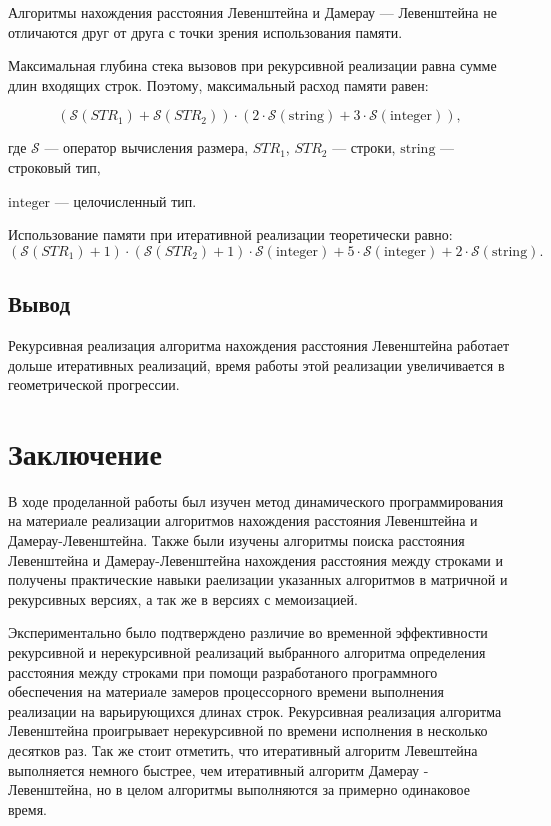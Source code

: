 \documentclass[12pt]{report}
\begin{document}
Алгоритмы нахождения расстояния Левенштейна и Дамерау — Левенштейна не отличаются друг от друга с точки зрения использования памяти.

Максимальная глубина стека вызовов при рекурсивной реализации равна сумме длин входящих строк. Поэтому, максимальный расход памяти равен: 

\begin{equation}
(\mathcal{S}(STR_1) + \mathcal{S}(STR_2)) \cdot (2 \cdot \mathcal{S}\mathrm{(string)} + 3 \cdot \mathcal{S}\mathrm{(integer)}),
\end{equation}

\noindent где $\mathcal{S}$ — оператор вычисления размера, $STR_1$, $STR_2$ — строки, $\mathrm{string}$ — строковый тип, 

\noindent $\mathrm{integer}$ — целочисленный тип.

Использование памяти при итеративной реализации теоретически равно:
\begin{equation}
(\mathcal{S}(STR_1) + 1) \cdot (\mathcal{S}(STR_2) + 1) \cdot \mathcal{S}\mathrm{(integer)} + 5\cdot \mathcal{S}\mathrm{(integer)} + 2 \cdot \mathcal{S}\mathrm{(string)}.
\end{equation}


\section{Вывод}

Рекурсивная реализация алгоритма нахождения расстояния Левенштейна работает дольше итеративных реализаций, время работы этой реализации увеличивается в геометрической прогрессии. 


\chapter*{Заключение}

В ходе проделанной работы был изучен метод динамического программирования на материале реализации алгоритмов нахождения расстояния Левенштейна и Дамерау-Левенштейна. Также были изучены алгоритмы поиска расстояния Левенштейна и Дамерау-Левенштейна нахождения расстояния между строками и получены практические навыки раелизации указанных алгоритмов в матричной и рекурсивных версиях, а так же в версиях с мемоизацией.

Экспериментально было подтверждено различие во временной эффективности рекурсивной и нерекурсивной реализаций выбранного алгоритма определения расстояния между строками при помощи разработаного программного обеспечения на материале замеров процессорного времени выполнения реализации на варьирующихся длинах строк. Рекурсивная реализация алгоритма Левенштейна проигрывает нерекурсивной по времени исполнения в несколько десятков раз. Так же стоит отметить, что итеративный алгоритм Левештейна выполняется немного быстрее, чем итеративный алгоритм Дамерау - Левенштейна, но в целом алгоритмы выполняются за примерно одинаковое время.
\end{document}
